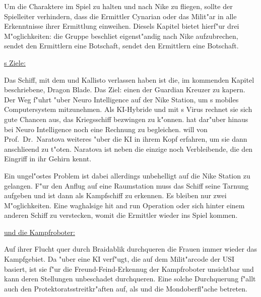 \begin{remarks}
	Um die Charaktere im Spiel zu halten und nach Nike zu fliegen, sollte der Spielleiter verhindern, dass die Ermittler Cynarian oder das Milit"ar in alle Erkenntnisse ihrer Ermittlung einweihen. Diesels Kapitel bietet hierf"ur drei M"oglichkeiten: die Gruppe beschlie\3t eigenst"andig nach Nike aufzubrechen, \xl{} sendet den Ermittlern eine Botschaft, \ml{} sendet den Ermittlern eine Botschaft.

	\underline{\xl{}s Ziele:}

	Das Schiff, mit dem \xl{} und \ml{} Kallisto verlassen haben ist die, im kommenden Kapitel beschriebene, Dragon Blade. Das Ziel: einen der Guardian Kreuzer zu kapern. Der Weg f"uhrt "uber Neuro Intelligence auf der Nike Station, um \ml{}s mobiles Computersystem mitzunehmen. Als KI-Hybride und mit \ml{}s Virus rechnet sie sich gute Chancen aus, das Kriegsschiff bezwingen zu k"onnen. \xl{} hat dar"uber hinaus bei Neuro Intelligence noch eine Rechnung zu begleichen. \xl{} will von Prof.~Dr.~Naratova weiteres "uber die KI in ihrem Kopf erfahren, um sie dann anschlie\3end zu t"oten. Naratova ist neben \ml{} die einzige noch Verbleibende, die den Eingriff in ihr Gehirn kennt. 
	
	Ein ungel"ostes Problem ist dabei allerdings unbehelligt auf die Nike Station zu gelangen. F"ur den Anflug auf eine Raumstation muss das Schiff seine Tarnung aufgeben und ist dann als Kampfschiff zu erkennen. Es bleiben nur zwei M"oglichkeiten. Eine waghalsige hit and run Operation oder sich hinter einem anderen Schiff zu verstecken, womit die Ermittler wieder ins Spiel kommen.

	\underline{\xl{} und die Kampfroboter:}

	Auf ihrer Flucht quer durch Braidablik durchqueren die Frauen immer wieder das Kampfgebiet. Da \xl{} "uber eine KI verf"ugt, die auf dem Milit"arcode der USI basiert, ist sie f"ur die Freund-Feind-Erkennug der Kampfroboter unsichtbar und kann deren Stellungen unbeschadet durchqueren. Eine solche Durchquerung f"allt auch den Protektoratsstreitkr"aften auf, als \xl{} und \ml{} die Mondoberfl"ache betreten. 
\end{remarks}
\vfill
